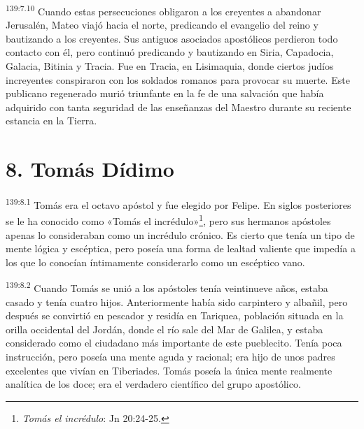 \par 
\textsuperscript{139:7.10} Cuando estas persecuciones obligaron a los creyentes a abandonar Jerusalén, Mateo viajó hacia el norte, predicando el evangelio del reino y bautizando a los creyentes. Sus antiguos asociados apostólicos perdieron todo contacto con él, pero continuó predicando y bautizando en Siria, Capadocia, Galacia, Bitinia y Tracia. Fue en Tracia, en Lisimaquia, donde ciertos judíos increyentes conspiraron con los soldados romanos para provocar su muerte. Este publicano regenerado murió triunfante en la fe de una salvación que había adquirido con tanta seguridad de las enseñanzas del Maestro durante su reciente estancia en la Tierra.

\section*{8. Tomás Dídimo}
\par 
\textsuperscript{139:8.1} Tomás era el octavo apóstol y fue elegido por Felipe. En siglos posteriores se le ha conocido como «Tomás el incrédulo»\footnote{\textit{Tomás el incrédulo}: Jn 20:24-25.}, pero sus hermanos apóstoles apenas lo consideraban como un incrédulo crónico. Es cierto que tenía un tipo de mente lógica y escéptica, pero poseía una forma de lealtad valiente que impedía a los que lo conocían íntimamente considerarlo como un escéptico vano.

\par 
\textsuperscript{139:8.2} Cuando Tomás se unió a los apóstoles tenía veintinueve años, estaba casado y tenía cuatro hijos. Anteriormente había sido carpintero y albañil, pero después se convirtió en pescador y residía en Tariquea, población situada en la orilla occidental del Jordán, donde el río sale del Mar de Galilea, y estaba considerado como el ciudadano más importante de este pueblecito. Tenía poca instrucción, pero poseía una mente aguda y racional; era hijo de unos padres excelentes que vivían en Tiberiades. Tomás poseía la única mente realmente analítica de los doce; era el verdadero científico del grupo apostólico.

